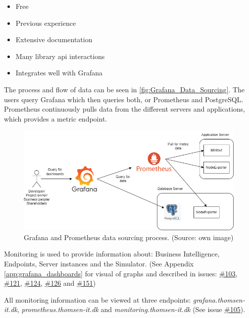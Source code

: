\begin{itemize}
    \item Free
    \item Previous experience
    \item Extensive documentation 
    \item Many library \gls{api} interactions
    \item Integrates well with Grafana
\end{itemize} 

The process and flow of data can be seen in \autoref{fig:Grafana_Data_Sourcing}. The users query Grafana which then queries both, or Prometheus and PostgreSQL. Prometheus continuously pulls data from the different servers and applications, which provides a metric endpoint. 

\begin{figure}[!ht]
    \centering
    \captionsetup{justification=centering,margin=1cm}
    \includegraphics[width=120mm]{images/monitoring/MetricDataPulling.png}
    \caption{Grafana and Prometheus data sourcing process. (Source: own image)}
    \label{fig:Grafana_Data_Sourcing}
\end{figure}


Monitoring is used to provide information about: Business Intelligence, Endpoints, Server instances and the Simulator. (See Appendix \ref{app:grafana_dashboards} for visual of graphs and described in issues: \href{https://github.com/DevelOpsITU/MiniTwit/issues/103}{\#103},  \href{https://github.com/DevelOpsITU/MiniTwit/issues/121}{\#121},
\href{https://github.com/DevelOpsITU/MiniTwit/issues/124}{\#124},
\href{https://github.com/DevelOpsITU/MiniTwit/issues/126}{\#126} and 
\href{https://github.com/DevelOpsITU/MiniTwit/issues/151}{\#151})\\

All monitoring information can be viewed at three endpoints: \textit{grafana.thomsen-it.dk}, \textit{prometheus.thomsen-it.dk} and \textit{monitoring.thomsen-it.dk} (See issue \href{https://github.com/DevelOpsITU/MiniTwit/issues/105}{\#105}).

